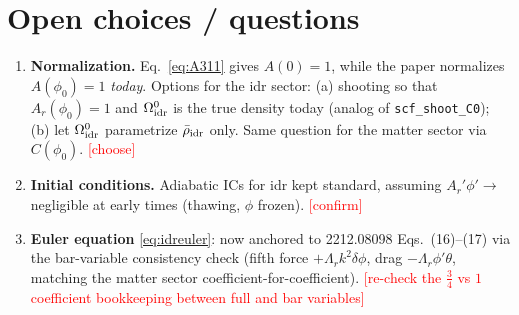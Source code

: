 \documentclass[11pt]{article}
\newcommand{\rhob}{\bar\rho}
\newcommand{\Ar}{A_{r}}
\newcommand{\todo}[1]{\textcolor{red}{[#1]}}
\begin{document}
\section{Open choices / questions}

\begin{enumerate}
\item \textbf{Normalization.} Eq.~\eqref{eq:A311} gives $A(0)=1$, while the paper
normalizes $A(\phi_0)=1$ \emph{today}. Options for the idr sector:
(a) shooting so that $\Ar(\phi_0)=1$ and $\Omega^0_{\rm idr}$ is the true density
today (analog of \texttt{scf\_shoot\_C0}); (b) let $\Omega^0_{\rm idr}$
parametrize $\rhob_{\rm idr}$ only. Same question for the matter sector via
$C(\phi_0)$. \todo{choose}
\item \textbf{Initial conditions.} Adiabatic ICs for idr kept standard, assuming
$\Ar'\phi'\to$ negligible at early times (thawing, $\phi$ frozen). \todo{confirm}
\item \textbf{Euler equation} \eqref{eq:idreuler}: now anchored to
2212.08098 Eqs.~(16)--(17) via the bar-variable consistency check
(fifth force $+\Lambda_r k^2\delta\phi$, drag $-\Lambda_r\phi'\theta$,
matching the matter sector coefficient-for-coefficient). \todo{re-check the
$\tfrac34$ vs $1$ coefficient bookkeeping between full and bar variables}
\end{enumerate}
\end{document}
